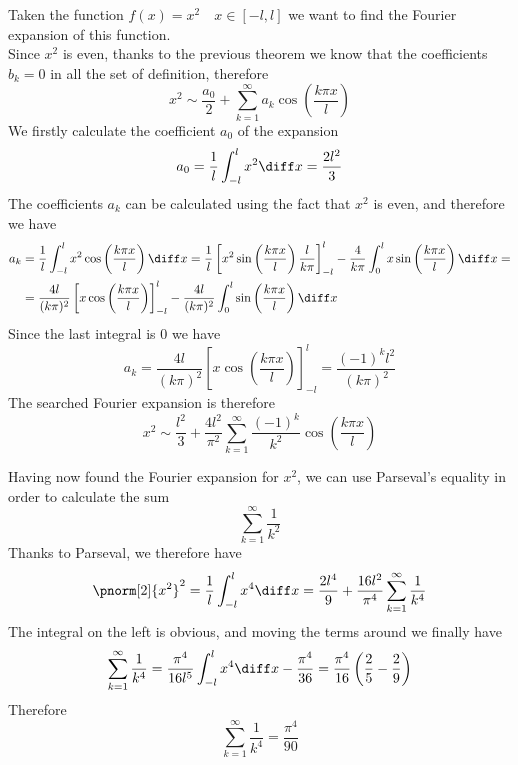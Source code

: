 \documentclass[../mmf.tex]{subfiles}
\begin{document}
\begin{eg}
	Taken the function $f(x)=x^2\quad x\in[-l,l]$ we want to find the Fourier expansion of this function.\\
	Since $x^2$ is even, thanks to the previous theorem we know that the coefficients $b_k=0$ in all the set of definition, therefore
	\begin{equation*}
		x^2\sim\frac{a_0}{2}+\sum_{k=1}^{\infty}a_k\cos\left( \frac{k\pi x}{l} \right)
	\end{equation*}
	We firstly calculate the coefficient $a_0$ of the expansion
	\begin{equation*}
		a_0=\frac{1}{l}\int_{-l}^{l}x^2\diff x=\frac{2l^2}{3}
	\end{equation*}
	The coefficients $a_k$ can be calculated using the fact that $x^2$ is even, and therefore we have
	\begin{equation*}
		\begin{aligned}
			a_k&=\frac{1}{l}\int_{-l}^{l}x^2\cos\left( \frac{k\pi x}{l} \right)\diff x=\frac{1}{l}\left[ x^2\sin\left( \frac{k\pi x}{l} \right)\frac{l}{k\pi} \right]^l_{-l}-\frac{4}{k\pi}\int_{0}^{l}x\sin\left( \frac{k\pi x}{l} \right)\diff x=\\
			&=\frac{4l}{(k\pi)^2}\left[ x\cos\left( \frac{k\pi x}{l} \right) \right]^l_{-l}-\frac{4l}{(k\pi)^2}\int_{0}^{l}\sin\left( \frac{k\pi x}{l} \right)\diff x
		\end{aligned}
	\end{equation*}
	Since the last integral is $0$ we have
	\begin{equation*}
		a_k=\frac{4l}{(k\pi)^2}\left[ x\cos\left( \frac{k\pi x}{l} \right) \right]^l_{-l}=\frac{(-1)^kl^2}{(k\pi)^2}
	\end{equation*}
	The searched Fourier expansion is therefore
	\begin{equation*}
		x^2\sim\frac{l^2}{3}+\frac{4l^2}{\pi^2}\sum_{k=1}^{\infty}\frac{(-1)^k}{k^2}\cos\left( \frac{k\pi x}{l} \right)
	\end{equation*}
\end{eg}
\begin{eg}
	Having now found the Fourier expansion for $x^2$, we can use Parseval's equality in order to calculate the sum
	\begin{equation*}
		\sum_{k=1}^{\infty}\frac{1}{k^2}
	\end{equation*}
	Thanks to Parseval, we therefore have
	\begin{equation*}
		\pnorm[2]{x^2}^2=\frac{1}{l}\int_{-l}^{l}x^4\diff x=\frac{2l^4}{9}+\frac{16l^2}{\pi^4}\sum_{k=1}^{\infty}\frac{1}{k^4}
	\end{equation*}
	The integral on the left is obvious, and moving the terms around we finally have
	\begin{equation*}
		\sum_{k=1}^{\infty}\frac{1}{k^4}=\frac{\pi^4}{16l^5}\int_{-l}^{l}x^4\diff x-\frac{\pi^4}{36}=\frac{\pi^4}{16}\left( \frac{2}{5}-\frac{2}{9} \right)%
	\end{equation*}
	Therefore
	\begin{equation*}
		\sum_{k=1}^{\infty}\frac{1}{k^4}=\frac{\pi^4}{90}
	\end{equation*}
\end{eg}
\end{document}

